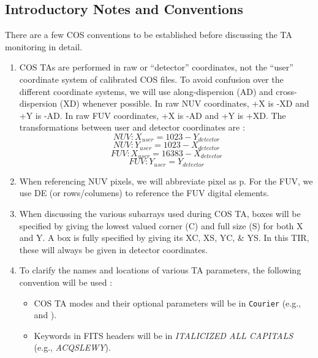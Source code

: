 \subsection{Introductory Notes and Conventions}\label{subsec:conventions}
There are a few COS conventions to be established before discussing the TA monitoring in detail.
\begin{enumerate}
	\item{COS TAs are performed in raw or ``detector'' coordinates, not the ``user'' coordinate system of calibrated
		COS files. To avoid confusion over the different coordinate systems, we will use along-dispersion (AD) and cross-dispersion (XD) whenever possible.
		In raw NUV coordinates, +X is -XD and +Y is -AD. In raw FUV coordinates, +X is -AD and +Y is +XD.
		The transformations between user and detector coordinates are :
		\begin{equation} NUV: X_{user} = 1023 - Y_{detector} \label{eq:NUVuserX}\end{equation}
		\begin{equation} NUV: Y_{user} = 1023 - X_{detector} \label{eq:NUVuserY}\end{equation}
		\begin{equation} FUV: X_{user} = 16383 - X_{detector} \label{eq:FUVuserX}\end{equation}
		\begin{equation} FUV: Y_{user} = Y_{detector} \label{eq:FUVuserY}\end{equation}
		}
	\item{When referencing NUV pixels, we will abbreviate pixel as p. For the FUV, we use DE (or rows/columens) to reference the FUV digital elements.}
	\item{When discussing the various subarrays used during COS TA, boxes will be specified by giving the lowest
		valued corner (C) and full size (S) for both X and Y. A box is fully specified by giving its XC, XS, YC, \& YS. In this TIR, these will always be given in detector coordinates.}
	\item{To clarify the names and locations of various TA parameters, the following convention will be used :
		\begin{itemize}
			\item{COS TA modes and their optional parameters will be in \texttt{Courier} (e.g.,  and \numpos).}
			\item{Keywords in FITS headers will be in \textit{ITALICIZED ALL CAPITALS} (e.g., \textit{ACQSLEWY}).}

\end{itemize}}
\end{enumerate}
